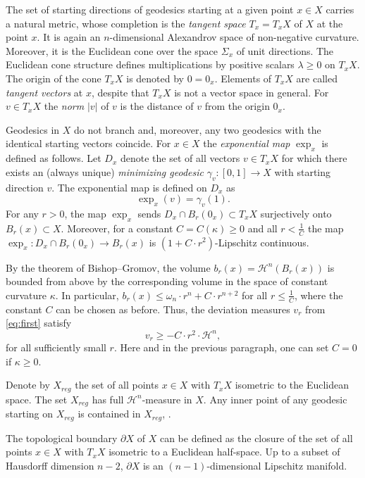 \documentclass[12pt,leqno,intlimits]{amsart}
\numberwithin{equation}{section}
\theoremstyle{definition}
\theoremstyle{remark}
\def\:{\colon}
\begin{document}
The set of starting directions of geodesics starting at a given point $x\in X$ carries a natural metric, whose completion is the \emph{tangent space} $T_x=T_xX$
of $X$ at the point $x$. It is again an $n$-dimensional Alexandrov space of non-negative curvature. Moreover, it is the Euclidean cone
over the space $\Sigma _x$ of unit directions. The Euclidean cone structure defines multiplications by positive scalars $\lambda \geq 0$ on $T_xX$. The origin
of the cone $T_xX$ is denoted by $0=0_x$.
Elements of $T_xX$ are called \emph{tangent vectors} at $x$, despite that $T_xX$ is not a vector space in general. 
For $v\in T_xX$ the \emph{norm} $|v|$ of $v$ is the distance of $v$ from the origin $0_x$.

Geodesics in $X$ do not branch
and, moreover, any two geodesics with the identical starting vectors coincide.
For $x\in X$ the \emph{exponential map} $\exp_x$ is defined as follows.
Let $D_x$ denote the set of all vectors $v\in T_xX$ for which there exists an (always unique) \emph{minimizing geodesic} $\gamma_v\:[0,1] \to X$ with starting direction $v$. The exponential map is defined on $D_x$ as
$$\exp _x (v)= \gamma _v(1).$$
For any $r>0$, the map $\exp_x$ sends $D_x\cap B_r (0_x)\subset T_xX$ surjectively onto $B_r(x)\subset X$.
Moreover, for a constant $C=C(\kappa)\geq 0$ and all $r< \frac 1 C$ the map $\exp_x \:D_x \cap B_r(0_x) \to B_r(x)$ is $(1+ C \cdot r^2)$-Lipschitz continuous.

By the theorem of Bishop--Gromov, the volume $b_r (x)=\mathcal H^n (B_r(x))$ is bounded from above by the corresponding volume in the
space of constant curvature $\kappa$. In particular, $b_r (x) \leq \omega _n \cdot r^n + C \cdot r^{n+2}$ for all $r\leq \frac 1 C$, where
the constant $C$ can be chosen as before. Thus, the deviation measures $v_r $ from \eqref{eq:first} satisfy
$$v_r \geq -C\cdot r^2\cdot  \mathcal H^n,$$ 
for all sufficiently small $r$.
Here and in the previous paragraph, one can set $C=0$ if $\kappa \geq 0$.

Denote by $X_{reg}$ the set of all points $x\in X$ with $T_xX$ isometric to the Euclidean space.
The set $X_{reg}$ has full $\mathcal H^n$-measure in $X$.
Any inner point of any geodesic starting on $X_{reg}$ is contained in $X_{reg}$, \cite{Petparallel}.

The topological boundary $\partial X$ of $X$ can be defined as the closure of the set of all points $x\in X$ with $T_xX$ isometric to a Euclidean half-space. Up to a subset of Hausdorff dimension $n-2$, $\partial X$ is an $(n-1)$-dimensional Lipschitz manifold.
\end{document}
